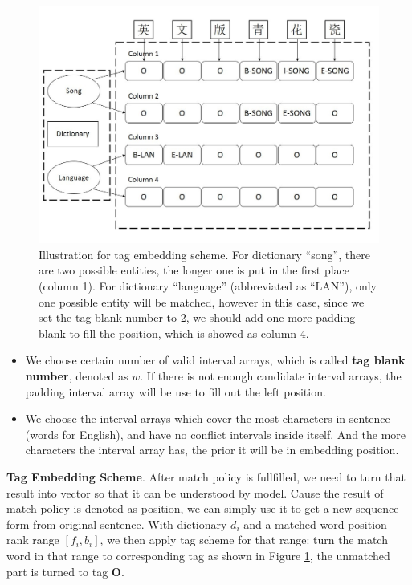 \documentclass[letterpaper]{article} %
\begin{document}
\begin{figure}[t]
\centering
\includegraphics[width=0.9\columnwidth]{tag_scheme} %
\caption{Illustration for tag embedding scheme. For dictionary ``song'', there are two possible entities, the longer one is put in the first place (column 1). For dictionary ``language'' (abbreviated as ``LAN''), only one possible entity will be matched, however in this case, since we set the tag blank number to 2, we should add one more padding blank to fill the position, which is showed as column 4. }
\label{tag_scheme}
\end{figure}

\begin{itemize}
\item We choose certain number of valid interval arrays, which is called \textbf{tag blank number}, denoted as $w$. If there is not enough candidate interval arrays, the padding interval array will be use to fill out the left position. 
\item We choose the interval arrays which cover the most characters in sentence (words for English), and have no conflict intervals inside itself. And the more characters the interval array has, the prior it will be in embedding position.
\end{itemize}



\textbf{Tag Embedding Scheme}. After match policy is fullfilled, we need to turn that result into vector so that it can be understood by model. Cause the result of match policy is denoted as position, we can simply use it to get a new sequence form from original sentence. With dictionary $d_i$ and a matched word position rank range $[f_i, b_i]$, we then apply tag scheme for that range: turn the match word in that range to corresponding tag as shown in Figure \ref{tag_scheme}, the unmatched part is turned to tag \textbf{O}.
\end{document}
